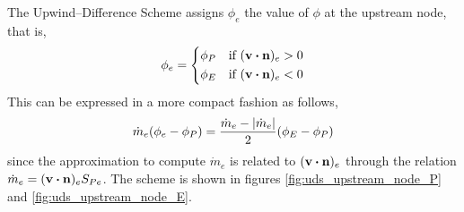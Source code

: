 The Upwind--Difference Scheme assigns $\phi_e$ the value of $\phi$ at the upstream node, that is,
\begin{equation}
	\phi_e = 
	\left\{
	\begin{aligned}
		&\phi_P & &\text{if } (\vb{v} \vdot \vb{n})_e > 0 \\
		&\phi_E & &\text{if } (\vb{v} \vdot \vb{n})_e < 0 \\
	\end{aligned}
	\right.
\end{equation}
This can be expressed in a more compact fashion as follows,
\begin{equation}
	\dot{m}_e ( \phi_e - \phi_P ) = 
	\frac{\dot{m}_e - \abs{\dot{m}_e}}{2} ( \phi_E - \phi_P )
\end{equation}
since the approximation to compute $\dot{m}_e$ is related to $(\vb{v} \vdot \vb{n})_e$ through the relation $\dot{m}_e = (\vb{v} \vdot \vb{n})_e S_{Pe}$. The scheme is shown in figures \ref{fig:uds_upstream_node_P} and \ref{fig:uds_upstream_node_E}.

